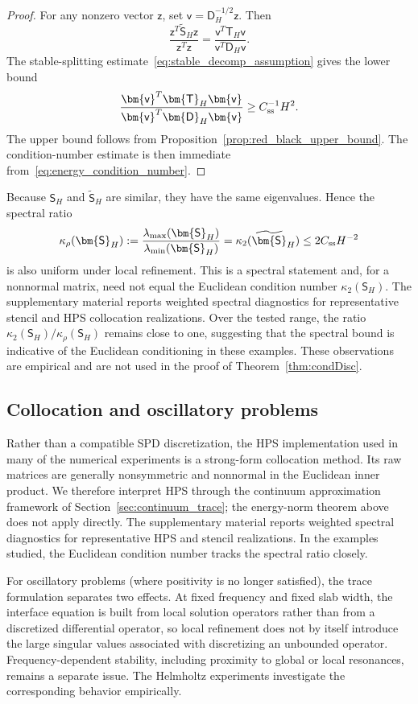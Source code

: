 \documentclass[final,onefignum,onetabnum]{siamart250211}
\newcommand{\vct}[1]{\bm{\mathsf{#1}}}
\newcommand{\mtx}[1]{\bm{\mathsf{#1}}}
\theoremstyle{definition}
\begin{document}
\begin{proof}
For any nonzero vector $\vct{z}$, set $\vct{v}=\mtx{D}_H^{-1/2}\vct{z}$.  Then
\[
  \frac{\vct{z}^T\widetilde{\mtx{S}}_H\vct{z}}
       {\vct{z}^T\vct{z}}
  =
  \frac{\vct{v}^T\mtx{T}_H\vct{v}}
       {\vct{v}^T\mtx{D}_H\vct{v}}.
\]
The stable-splitting estimate~\eqref{eq:stable_decomp_assumption} gives the lower bound
\[
  \frac{\vct{v}^T\mtx{T}_H\vct{v}}
       {\vct{v}^T\mtx{D}_H\vct{v}}
  \ge C_{\rm ss}^{-1}H^2.
\]
The upper bound follows from Proposition~\ref{prop:red_black_upper_bound}.  The condition-number estimate is then immediate from~\eqref{eq:energy_condition_number}.
\end{proof}

Because $\mtx{S}_H$ and $\widetilde{\mtx{S}}_H$ are similar, they have the same eigenvalues. Hence the spectral ratio
\[
\ensuremath{\kappa_{\rho}(\mtx{S}_H):=\frac{\lambda_{\max}(\mtx{S}_H)}{\lambda_{\min}(\mtx{S}_H)}=\kappa_2(\widetilde{\mtx{S}}_H)\le 2C_{\rm ss}H^{-2}}
\]
is also uniform under local refinement. This is a spectral statement and, for a nonnormal matrix, need not equal the Euclidean condition number $\kappa_2(\mtx{S}_H)$. The supplementary material reports weighted spectral diagnostics for representative stencil and HPS collocation realizations. Over the tested range, the ratio $\kappa_2(\mtx{S}_H)/\kappa_{\rho}(\mtx{S}_H)$ remains close to one, suggesting that the spectral bound is indicative of the Euclidean conditioning in these examples. These observations are empirical and are not used in the proof of Theorem~\ref{thm:condDisc}.

\subsection{Collocation and oscillatory problems}
Rather than a compatible SPD discretization, the HPS implementation used in many of the numerical experiments is a strong-form collocation method. Its raw matrices are generally nonsymmetric and nonnormal in the Euclidean inner product. We therefore interpret HPS through the continuum approximation framework of Section~\ref{sec:continuum_trace}; the energy-norm theorem above does not apply directly. The supplementary material reports weighted spectral diagnostics for representative HPS and stencil realizations. In the examples studied, the Euclidean condition number tracks the spectral ratio closely.

For oscillatory problems (where positivity is no longer satisfied), the trace formulation separates two effects.  At fixed frequency and fixed slab width, the interface equation is built from local solution operators rather than from a discretized differential operator, so local refinement does not by itself introduce the large singular values associated with discretizing an unbounded operator. Frequency-dependent stability, including proximity to global or local resonances, remains a separate issue. The Helmholtz experiments investigate the corresponding behavior empirically.
\end{document}

